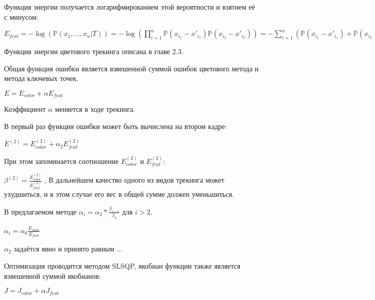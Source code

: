 Функция энергии получается логарифмированием этой вероятности и взятием её с
минусом:

$
    E_{feat} =
        - \log(\mathbb{P}(x_1, ..., x_n | T)) = 
        - \log(\prod\limits_{i = 1}^n \mathbb{P}(x_{i_1} - x'_{i_1}) \mathbb{P}(x_{i_2} - x'_{i_2})) =  - \sum\limits_{i = 1}^{n}( \mathbb{P}(x_{i_1} - x'_{i_1}) + \mathbb{P}(x_{i_2} - x'_{i_2}))
$

Функция энергии цветового трекинга описана в главе 2.3. %

Общая функция ошибки является взвешенной суммой ошибок цветового метода и
метода ключевых точек. 

$E = E_{color} + \alpha E_{feat}$

Коэффициент $\alpha$ меняется в ходе трекинга.

В первый раз функция ошибки может быть вычислена на втором кадре:

$E^{(2)} = E_{color}^{(2)} + \alpha_2 E_{feat}^{(2)}$

При этом запоминается соотношение $E_{color}^{(2)}$ и $E_{feat}^{(2)}$:

$\beta^{(2)} = \frac{E_{color}^{(2)}}{E_{feat}^{(2)}}$
,
В дальнейшем качество одного из видов трекинга может ухудшиться, и в этом
случае его вес в общей сумме должен уменьшиться.

В предлагаемом методе $\alpha_i = \alpha_2 * \frac{\beta_{i - 1}}{\beta_2}$ для $i > 2$.

$\alpha_i = \alpha_0 \frac{E_{color}}{E_{feat}}$

$\alpha_2$ задаётся явно и принято равным ...

Оптимизация проводится методом SLSQP, якобиан функции также является взвешенной
суммой якобианов:

$J = J_{color} + \alpha J_{feat}$
